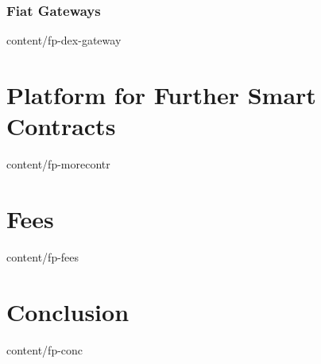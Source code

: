 \documentclass{btswhitepaper}
\begin{document}
\subsubsection  { Fiat Gateways                                    }  { content/fp-dex-gateway         } 

\section        { Platform for Further Smart Contracts             }  { content/fp-morecontr           }


\section        { Fees                                             }  { content/fp-fees                } 

\section        { Conclusion                                       }  { content/fp-conc                } 


\end{document}
